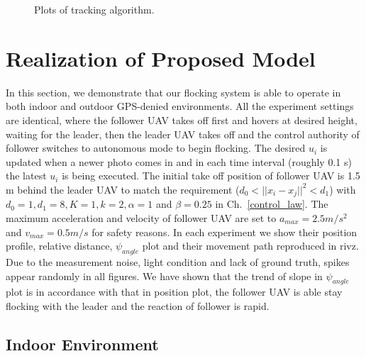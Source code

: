 \begin{figure}[H]
  \caption{Plots of tracking algorithm.}\label{fig:track_plot}
\end{figure}

\section{Realization of Proposed Model}

In this section, we demonstrate that our flocking system is able to operate in both indoor and outdoor GPS-denied environments. All the experiment settings are identical, where the follower UAV takes off first and hovers at desired height, waiting for the leader, then the leader UAV takes off and the control authority of follower switches to autonomous mode to begin flocking. The desired $u_i$ is updated when a newer photo comes in and in each time interval (roughly 0.1 s) the latest $u_i$ is being executed. The initial take off position of follower UAV is 1.5 m behind the leader UAV to match the requirement ($d_0<||x_i-x_j||^2<d_1$) with $d_0=1, d_1=8, K=1, k=2, \alpha=1$ and $\beta=0.25$ in Ch.~\ref{control_law}. The maximum acceleration and velocity of follower UAV are set to $a_{max}=2.5 m/s^2$ and $v_{max}=0.5 m/s$ for safety reasons. In each experiment we show their position profile, relative distance, $\psi_{angle}$ plot and their movement path reproduced in rivz. Due to the measurement noise, light condition and lack of ground truth, spikes appear randomly in all figures. We have shown that the trend of slope in $\psi_{angle}$ plot is in accordance with that in position plot, the follower UAV is able stay flocking with the leader and the reaction of follower is rapid.

\subsection{Indoor Environment}


